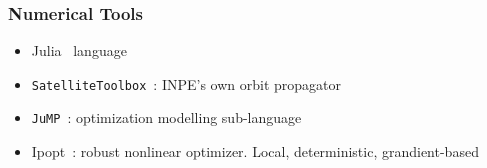 \documentclass[handout]{beamer}
\begin{document}
\begin{frame}
    \frametitle{Numerical Tools}

    \begin{itemize}
        \item<2-> Julia~\cite{Julia-2017} language
        \item<3-> \texttt{SatelliteToolbox}~\cite{satellitetoolbox}: INPE's own orbit propagator
        \item<4-> \texttt{JuMP}~\cite{jump}: optimization modelling sub-language
        \item<5-> Ipopt~\cite{ipopt}: robust nonlinear optimizer. Local, deterministic, grandient-based
    \end{itemize}
    
    \begin{figure}[htbp]
        \centering
\end{figure}
\end{frame}
\end{document}

